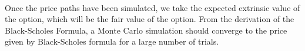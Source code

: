   \paragraph{}
  
Once the price paths have been simulated, we take the expected extrinsic value of the option, which will be the fair value of the option. From the derivation of the Black-Scholes Formula, a Monte Carlo simulation should converge to the price given by Black-Scholes formula for a large number of trials.





